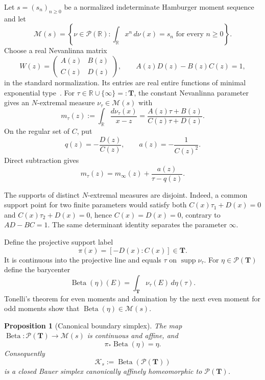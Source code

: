 \documentclass[11pt]{article}
\newtheorem{proposition}[theorem]{Proposition}
\newcommand{\R}{\mathbb R}
\newcommand{\cK}{\mathcal K}
\newcommand{\cM}{\mathcal M}
\newcommand{\cP}{\mathcal P}
\newcommand{\supp}{\operatorname{supp}}
\newcommand{\Beta}{\operatorname{Beta}}
\begin{document}
Let $s=(s_n)_{n\geq0}$ be a normalized indeterminate Hamburger moment sequence and let
\[
  \cM(s)=\left\{\nu\in\cP(\R):\int_{\R}x^n\,d\nu(x)=s_n
  \text{ for every }n\geq0\right\}.
\]
Choose a real Nevanlinna matrix
\[
  W(z)=\begin{pmatrix}A(z)&B(z)\\ C(z)&D(z)\end{pmatrix},
  \qquad A(z)D(z)-B(z)C(z)=1,
\]
in the standard normalization.  Its entries are real entire functions of minimal exponential
type~\cite{Akhiezer1965,PrucknerEtAl2023}.  For
$\tau\in\R\cup\{\infty\}=:\mathbf T$, the constant Nevanlinna parameter gives an
$N$-extremal measure $\nu_\tau\in\cM(s)$ with
\begin{equation}\label{eq:nev-family}
  m_\tau(z):=\int_{\R}\frac{d\nu_\tau(x)}{x-z}
  =\frac{A(z)\tau+B(z)}{C(z)\tau+D(z)}.
\end{equation}
On the regular set of $C$, put
\begin{equation}\label{eq:q}
  q(z)=-\frac{D(z)}{C(z)},\qquad
  a(z)=-\frac{1}{C(z)^2}.
\end{equation}
Direct subtraction gives
\begin{equation}\label{eq:mobius-difference}
  m_\tau(z)=m_\infty(z)+\frac{a(z)}{\tau-q(z)}.
\end{equation}

The supports of distinct $N$-extremal measures are disjoint.  Indeed, a common support point for
two finite parameters would satisfy both $C(x)\tau_1+D(x)=0$ and
$C(x)\tau_2+D(x)=0$, hence $C(x)=D(x)=0$, contrary to
$AD-BC=1$.  The same determinant identity separates the parameter $\infty$.

Define the projective support label
\begin{equation}\label{eq:pi}
  \pi(x)=[-D(x):C(x)]\in\mathbf T.
\end{equation}
It is continuous into the projective line and equals $\tau$ on
$\supp\nu_\tau$.  For $\eta\in\cP(\mathbf T)$ define the barycenter
\begin{equation}\label{eq:beta}
  \Beta(\eta)(E)=\int_{\mathbf T}\nu_\tau(E)\,d\eta(\tau).
\end{equation}
Tonelli's theorem for even moments and domination by the next even moment for odd moments show
that $\Beta(\eta)\in\cM(s)$.

\begin{proposition}[Canonical boundary simplex]\label{prop:beta}
The map $\Beta:\cP(\mathbf T)\to\cM(s)$ is continuous and affine, and
\begin{equation}\label{eq:left-inverse}
  \pi_*\Beta(\eta)=\eta.
\end{equation}
Consequently
\[
  \cK_s:=\Beta(\cP(\mathbf T))
\]
is a closed Bauer simplex canonically affinely homeomorphic to
$\cP(\mathbf T)$.
\end{proposition}
\end{document}
